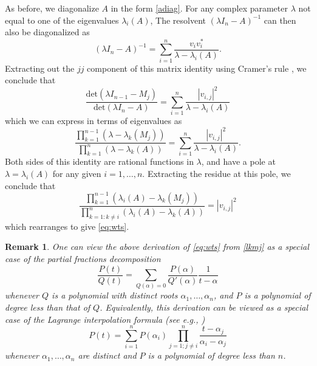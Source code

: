 \documentclass{amsart}
\newtheorem{remark}[lemma]{Remark}
\begin{document}
As before, we diagonalize $A$ in the form \eqref{adiag}.  For any complex parameter $\lambda$ not equal to one of the eigenvalues $\lambda_i(A)$, The resolvent $(\lambda I_n - A)^{-1}$ can then also be diagonalized as
\begin{equation}\label{res}
 (\lambda I_n - A)^{-1} = \sum_{i=1}^n \frac{v_i v_i^*}{\lambda - \lambda_i(A)}.
\end{equation}
Extracting out the $jj$ component of this matrix identity using Cramer's rule \cite{cramer}, we conclude that
$$ \frac{\mathrm{det}(\lambda I_{n-1} - M_j)}{\mathrm{det}(\lambda I_n - A)} = \sum_{i=1}^n \frac{|v_{i,j}|^2}{\lambda - \lambda_i(A)}$$
which we can express in terms of eigenvalues as
\begin{equation}\label{lkmj}
 \frac{\prod_{k=1}^{n-1} (\lambda - \lambda_k(M_j))}{\prod_{k=1}^n (\lambda - \lambda_k(A))} = \sum_{i=1}^n \frac{|v_{i,j}|^2}{\lambda - \lambda_i(A)}.
\end{equation}
Both sides of this identity are rational functions in $\lambda$, and have a pole at $\lambda = \lambda_i(A)$ for any given $i=1,\dots,n$.  Extracting the residue at this pole, we conclude that
$$ \frac{\prod_{k=1}^{n-1} (\lambda_i(A) - \lambda_k(M_j))}{\prod_{k=1: k \neq i}^n (\lambda_i(A) - \lambda_k(A))} = |v_{i,j}|^2$$
which rearranges to give \eqref{eq:wts}.

\begin{remark}  One can view the above derivation of \eqref{eq:wts} from \eqref{lkmj} as a special case of the partial fractions decomposition
$$ \frac{P(t)}{Q(t)} = \sum_{Q(\alpha)=0} \frac{P(\alpha)}{Q'(\alpha)} \frac{1}{t-\alpha}$$
whenever $Q$ is a polynomial with distinct roots $\alpha_1,\dots,\alpha_n$, and $P$ is a polynomial of degree less than that of $Q$.  Equivalently, this derivation can be viewed as a special case of the Lagrange interpolation formula (see e.g., \cite[\S 25.2]{AS})
$$ P(t) = \sum_{i=1}^n P(\alpha_i) \prod_{j=1; j \neq i}^n \frac{t - \alpha_j}{\alpha_i-\alpha_j} $$
whenever $\alpha_1,\dots,\alpha_n$ are distinct and $P$ is a polynomial of degree less than $n$.
\end{remark}
\end{document}
